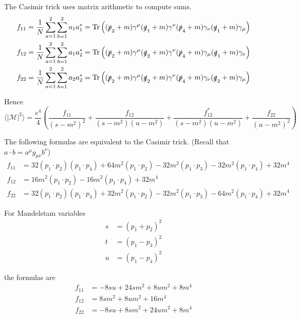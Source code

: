 \documentclass[12pt]{article}
\begin{document}
The Casimir trick uses matrix arithmetic to compute sums.
\begin{align*}
f_{11}&=\frac{1}{N} \sum_{a=1}^2\sum_{b=1}^2 a_1a_1^*=\mathop{\rm Tr}
\left(
(\slashed{p}_2+m)\gamma^\mu(\slashed{q}_1+m)\gamma^\nu(\slashed{p}_4+m)\gamma_\nu(\slashed{q}_1+m)\gamma_\mu
\right)
\\
f_{12}&=\frac{1}{N} \sum_{a=1}^2\sum_{b=1}^2 a_1a_2^*=\mathop{\rm Tr}
\left(
(\slashed{p}_2+m)\gamma^\mu(\slashed{q}_2+m)\gamma^\nu(\slashed{p}_4+m)\gamma_\mu(\slashed{q}_1+m)\gamma_\nu
\right)
\\
f_{22}&=\frac{1}{N} \sum_{a=1}^2\sum_{b=1}^2 a_2a_2^*=\mathop{\rm Tr}
\left(
(\slashed{p}_2+m)\gamma^\mu(\slashed{q}_2+m)\gamma^\nu(\slashed{p}_4+m)\gamma_\nu(\slashed{q}_2+m)\gamma_\mu
\right)
\end{align*}

Hence
\begin{equation*}
\langle|\mathcal{M}|^2\rangle
=
\frac{e^4}{4}
\left(
\frac{f_{11}}{(s-m^2)^2}
+\frac{f_{12}}{(s-m^2)(u-m^2)}
+\frac{f_{12}^*}{(s-m^2)(u-m^2)}
+\frac{f_{22}}{(u-m^2)^2}
\right)
\tag{1}
\end{equation*}

The following formulas are equivalent to the Casimir trick.
(Recall that $a\cdot b=a^\mu g_{\mu\nu}b^\nu$)
\begin{align*}
f_{11}&=
 32 (p_1 \cdot p_2) (p_1 \cdot p_4) +
 64 m^2 (p_1 \cdot p_2) -
 32 m^2 (p_1 \cdot p_3) -
 32 m^2 (p_1 \cdot p_4) + 32 m^4
\\
f_{12}&=16 m^2 (p_1 \cdot p_2) - 16 m^2 (p_1 \cdot p_4) + 32m^4
\\
f_{22}&=
32 (p_1 \cdot p_2) (p_1 \cdot p_4) +
32 m^2 (p_1 \cdot p_2) -
32 m^2 (p_1 \cdot p_3) -
64 m^2 (p_1 \cdot p_4) + 32 m^4
\end{align*}

For Mandelstam variables
\begin{align*}
s&=(p_1+p_2)^2
\\
t&=(p_1-p_3)^2
\\
u&=(p_1-p_4)^2
\end{align*}

the formulas are
\begin{equation*}
\begin{aligned}
f_{11}&=-8 s u + 24 s m^2 + 8 u m^2 + 8 m^4
\\
f_{12}&=8 s m^2 + 8 u m^2 + 16 m^4
\\
f_{22}&=-8 s u + 8 s m^2 + 24 u m^2 + 8 m^4
\end{aligned}
\tag{2}
\end{equation*}
\end{document}
